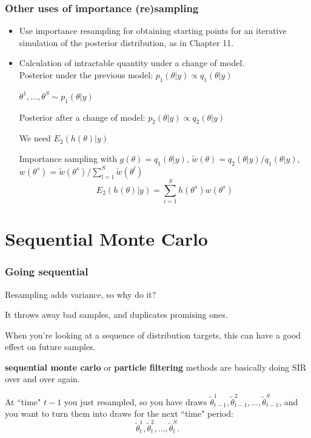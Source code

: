 \documentclass{beamer}
\begin{document}
\begin{frame}[fragile]
  \frametitle{Other uses of importance (re)sampling}
  \begin{itemize}
  \item Use importance resampling for obtaining starting points for an
    iterative simulation of the posterior distribution, as in Chapter
    11.
\pause
\item Calculation of intractable quantity under a change of model.\\

Posterior under the previous model: $p_1(\theta|y) \propto q_1(\theta|y)$

$\theta^1, \ldots, \theta^S \sim p_1(\theta|y)$

Posterior after a change of model: $p_2(\theta|y) \propto q_2(\theta|y)$

We need $E_2(h(\theta)|y)$
\pause

Importance sampling with $g(\theta) = q_1(\theta|y)$,
$\tilde{w}(\theta) = q_2(\theta|y)/q_1(\theta|y)$, $w(\theta^s) =
\tilde{w}(\theta^s)/\sum_{l=1}^S \tilde{w}(\theta^l)$
\[
E_2(h(\theta)|y) = \sum_{i=1}^S h(\theta^s) w(\theta^s)
\]
\end{itemize}
\end{frame}


\section{Sequential Monte Carlo}
\begin{frame}[fragile]
\frametitle{Going sequential}

Resampling adds variance, so why do it?
\newline

It throws away bad samples, and duplicates promising ones. 
\newline

When you're looking at a sequence of distribution targets, this can have a good effect on future samples.
\pause
\newline

{\bf sequential monte carlo} or {\bf particle filtering} methods are basically doing SIR over and over again. 
\newline

At ``time" $t-1$ you just resampled, so you have draws $\tilde{\theta}^1_{t-1}, \tilde{\theta}^2_{t-1}, \ldots, \tilde{\theta}^S_{t-1}$, and you want to turn them into draws for the next ``time" period:
$$
\tilde{\theta}^1_{t}, \tilde{\theta}^2_{t}, \ldots, \tilde{\theta}^S_{t}.
$$

\end{frame}
\end{document}
